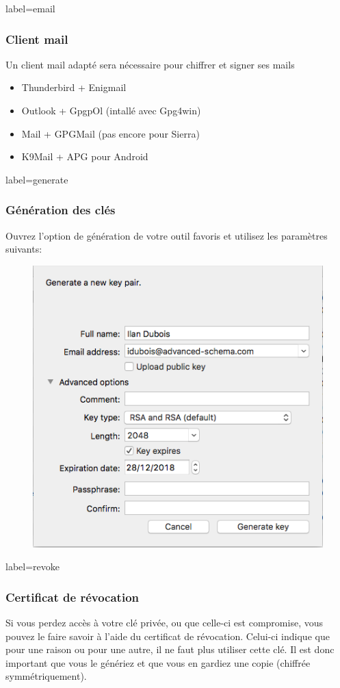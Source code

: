 \documentclass{beamer}
\begin{document}
        \begin{frame}{label=email}
            \frametitle{Client mail}
            Un client mail adapté sera nécessaire pour chiffrer et signer ses mails
            \begin{center}
                \begin{itemize}
                    \item Thunderbird + Enigmail
                    \item Outlook + GpgpOl (intallé avec Gpg4win)
                    \item Mail + GPGMail (pas encore pour Sierra)
                    \item K9Mail + APG pour Android
                \end{itemize}
            \end{center}
        \end{frame}
        \begin{frame}{label=generate}
            \frametitle{Génération des clés}
            Ouvrez l'option de génération de votre outil favoris et utilisez les paramètres suivants:
            \begin{center}
                \begin{figure}
                    \includegraphics[scale=0.40]{img/gen.png}
                \end{figure}
            \end{center}
        \end{frame}
        \begin{frame}{label=revoke}
            \frametitle{Certificat de révocation}
            Si vous perdez accès à votre clé privée, ou que celle-ci est compromise, vous pouvez le faire savoir à l'aide du certificat de révocation.
            Celui-ci indique que pour une raison ou pour une autre, il ne faut plus utiliser cette clé. Il est donc important que vous le génériez et que vous en gardiez une copie (chiffrée symmétriquement).
        \end{frame}
        \appendix
        \begin{frame}
            {}
            
        \end{frame}
\end{document}
